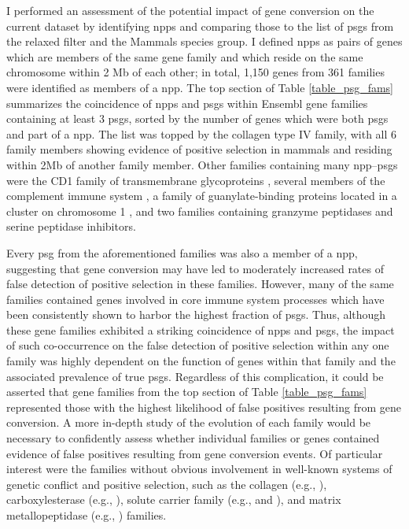 I performed an assessment of the potential impact of gene conversion
on the current dataset by identifying \acp{npp} and comparing those to
the list of \psgefive \acp{psg} from the relaxed \sw filter and the
Mammals species group. I defined \acp{npp} as pairs of genes which are
members of the same \ens gene family and which reside on the same
chromosome within 2 Mb of each other; in total, 1,150 genes from 361
\ens families were identified as members of a \ac{npp}. The top
section of Table \ref{table_psg_fams} summarizes the coincidence of
\acp{npp} and \acp{psg} within Ensembl gene families containing at
least 3 \acp{psg}, sorted by the number of genes which were both
\acp{psg} and part of a \ac{npp}. The list was topped by the collagen
type IV family, with all 6 family members showing evidence of positive
selection in mammals and residing within 2Mb of another family
member. Other families containing many \ac{npp}--\acp{psg} were the
CD1 family of transmembrane glycoproteins \citep{Joyce2001}, several
members of the complement immune system \citep{Nonaka2006}, a family
of guanylate-binding proteins located in a cluster on chromosome 1
\citep{Olszewski2006}, and two families containing granzyme peptidases
and serine peptidase inhibitors.

Every \ac{psg} from the aforementioned families was also a member of a
\ac{npp}, suggesting that gene conversion may have led to moderately
increased rates of false detection of positive selection in these
families. However, many of the same families contained genes involved
in core immune system processes which have been consistently shown to
harbor the highest fraction of \acp{psg}. Thus, although these gene
families exhibited a striking coincidence of \acp{npp} and \acp{psg},
the impact of such co-occurrence on the false detection of positive
selection within any one family was highly dependent on the function
of genes within that family and the associated prevalence of true
\acp{psg}. Regardless of this complication, it could be asserted that
gene families from the top section of Table \ref{table_psg_fams}
represented those with the highest likelihood of false positives
resulting from gene conversion. A more in-depth study of the evolution
of each family would be necessary to confidently assess whether
individual families or genes contained evidence of false positives
resulting from gene conversion events. Of particular interest were the
families without obvious involvement in well-known systems of genetic
conflict and positive selection, such as the collagen (e.g.,
), carboxylesterase (e.g., ), solute carrier
family (e.g.,  and ), and matrix
metallopeptidase (e.g., ) families.


